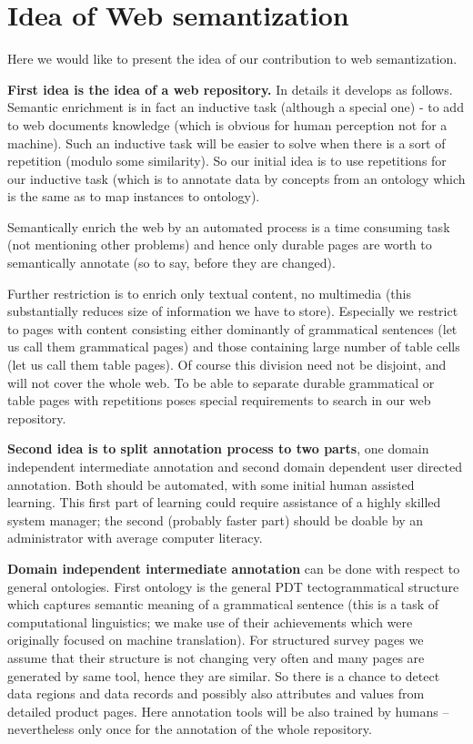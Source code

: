 \documentclass{sig-alternate}
\begin{document}
\section{Idea of Web semantization}
Here we would like to present the idea of our contribution to web semantization.

\textbf{First idea is the idea of a web repository.} In details it develops as follows. Semantic enrichment is in fact an inductive task (although a special one) - to add to web documents knowledge (which is obvious for human perception not for a machine). Such an inductive task will be easier to solve when there is a sort of repetition (modulo some similarity). So our initial idea is to use repetitions for our inductive task (which is to annotate data by concepts from an ontology which is the same as to map instances to ontology). 

Semantically enrich the web by an automated process is a time consuming task (not mentioning other problems) and hence only durable pages are worth to semantically annotate (so to say, before they are changed). 

Further restriction is to enrich only textual content, no multimedia (this substantially reduces size of information we have to store). Especially we restrict to pages with content consisting either dominantly of grammatical sentences (let us call them grammatical pages) and those containing large number of table cells (let us call them table pages). Of course this division need not be disjoint, and will not cover the whole web. 
To be able to separate durable grammatical or table pages with repetitions poses special requirements to search in our web repository.

\textbf{Second idea is to split annotation process to two parts}, one domain independent intermediate annotation and second domain dependent user directed annotation. Both should be automated, with some initial human assisted learning. This first part of learning could require assistance of a highly skilled system manager; the second (probably faster part) should be doable by an administrator with average computer literacy. 

\textbf{Domain independent intermediate annotation} can be done with respect to general ontologies. First ontology is the general PDT tectogrammatical structure which captures semantic meaning of a grammatical sentence (this is a task of computational linguistics; we make use of their achievements which were originally focused on machine translation). For structured survey pages we assume that their structure is not changing very often and many pages are generated by same tool, hence they are similar. So there is a chance to detect data regions and data records and possibly also attributes and values from detailed product pages. Here annotation tools will be also trained by humans -- nevertheless only once for the annotation of the whole repository. 
\end{document}
